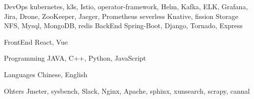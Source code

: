 

\begin{cvskills}

  \cvskill
    {DevOps} %
    {kubernetes, k3s, Istio, operator-framework, Helm, Kafka, ELK, Grafana, Jira, Drone, ZooKeeper, Jaeger, Prometheus} %
  \cvskill
    {severless}
    {Knative, fission}
  \cvskill
    {Storage}
    {NFS, Mysql, MongoDB, redis}
  \cvskill
    {BackEnd} %
    {Spring-Boot, Django, Tornado, Express} %

  \cvskill
    {FrontEnd} %
    {React, Vue} %

  \cvskill
    {Programming} %
    {JAVA, C++, Python, JavaScript} %

  \cvskill
    {Languages} %
    {Chinese, English} %
    
  \cvskill
    {Ohters} %
    {Jmeter, sysbench, Slack, Nginx, Apache, sphinx, xunsearch, scrapy, cannal} %
\end{cvskills}
